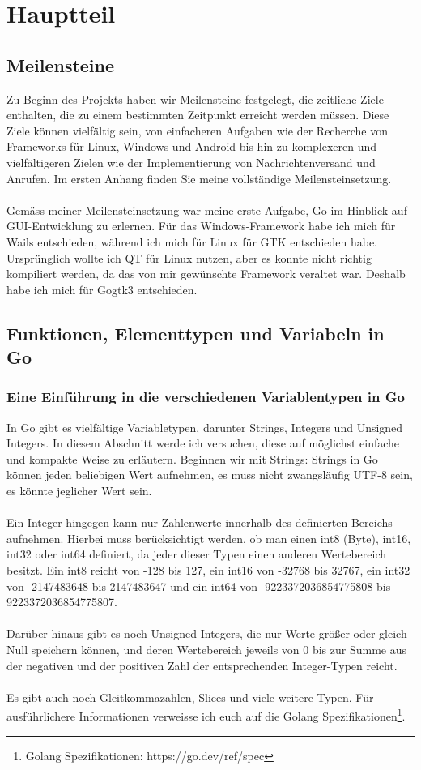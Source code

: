 \section{Hauptteil}
\subsection{Meilensteine}
Zu Beginn des Projekts haben wir Meilensteine festgelegt, die zeitliche Ziele enthalten, die zu einem bestimmten Zeitpunkt erreicht werden müssen.
Diese Ziele können vielfältig sein, von einfacheren Aufgaben wie der Recherche von Frameworks für Linux, Windows und Android bis hin zu komplexeren und vielfältigeren Zielen wie der Implementierung von Nachrichtenversand und Anrufen.
Im ersten Anhang finden Sie meine vollständige Meilensteinsetzung. \\\\
Gemäss meiner Meilensteinsetzung war meine erste Aufgabe, Go im Hinblick auf
GUI-Entwicklung zu erlernen. Für das Windows-Framework habe ich mich für Wails \cite{wails} entschieden, während ich mich für Linux für GTK entschieden habe.
Ursprünglich wollte ich QT \cite{qt} für Linux nutzen, aber es konnte nicht richtig kompiliert werden, da das von mir gewünschte Framework veraltet war. Deshalb habe ich mich für Gogtk3 \cite{gogtk3} entschieden.
\subsection{Funktionen, Elementtypen und Variabeln in Go}
\subsubsection{Eine Einführung in die verschiedenen Variablentypen in Go}
In Go gibt es vielfältige Variabletypen, darunter Strings, Integers und Unsigned Integers. In diesem Abschnitt werde ich versuchen, diese auf möglichst einfache und kompakte Weise zu erläutern. Beginnen wir mit Strings: Strings in Go können jeden beliebigen Wert aufnehmen, es muss nicht zwangsläufig UTF-8 sein, es könnte jeglicher Wert sein.\\\\
Ein Integer hingegen kann nur Zahlenwerte innerhalb des definierten Bereichs aufnehmen. Hierbei muss berücksichtigt werden, ob man einen int8 (Byte), int16, int32 oder int64 definiert, da jeder dieser Typen einen anderen Wertebereich besitzt. Ein int8 reicht von -128 bis 127, ein int16 von -32768 bis 32767, ein int32 von -2147483648 bis 2147483647 und ein int64 von -9223372036854775808 bis 9223372036854775807.\\\\
Darüber hinaus gibt es noch Unsigned Integers, die nur Werte größer oder gleich Null speichern können, und deren Wertebereich jeweils von 0 bis zur Summe aus der negativen und der positiven Zahl der entsprechenden Integer-Typen reicht.\\\\
Es gibt auch noch Gleitkommazahlen, Slices und viele weitere Typen. Für ausführlichere Informationen verweisse ich euch auf die Golang Spezifikationen\footnote{Golang Spezifikationen: https://go.dev/ref/spec}.
